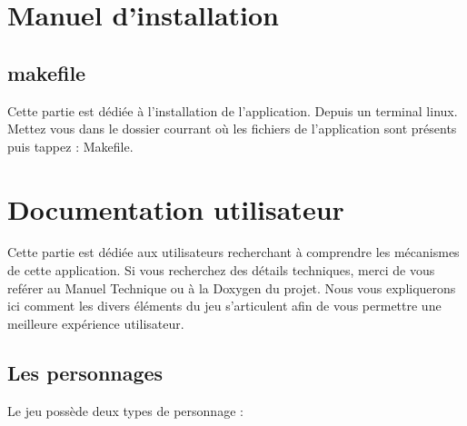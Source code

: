 \documentclass[a4paper 12pts]{article}
\begin{document}
\newpage

\section{Manuel d'installation}

\vspace{1.5cm}


\subsection{makefile}


Cette partie est dédiée à l'installation de l'application.
Depuis un terminal linux.
Mettez vous dans le dossier courrant où les fichiers de l'application sont présents puis tappez :
Makefile.


\newpage

\section{Documentation utilisateur}


\vspace{2cm}

Cette partie est dédiée aux utilisateurs recherchant à comprendre les mécanismes de cette application.
Si vous recherchez des détails techniques, merci de vous reférer au Manuel Technique ou à la Doxygen du projet.
Nous vous expliquerons ici comment les divers éléments du jeu s'articulent afin de vous permettre une meilleure expérience utilisateur.

\vspace{0.5cm}	

\subsection{Les personnages}

\vspace{1cm}


Le jeu possède deux types de personnage : 

\vspace{0.5cm}
\end{document}
